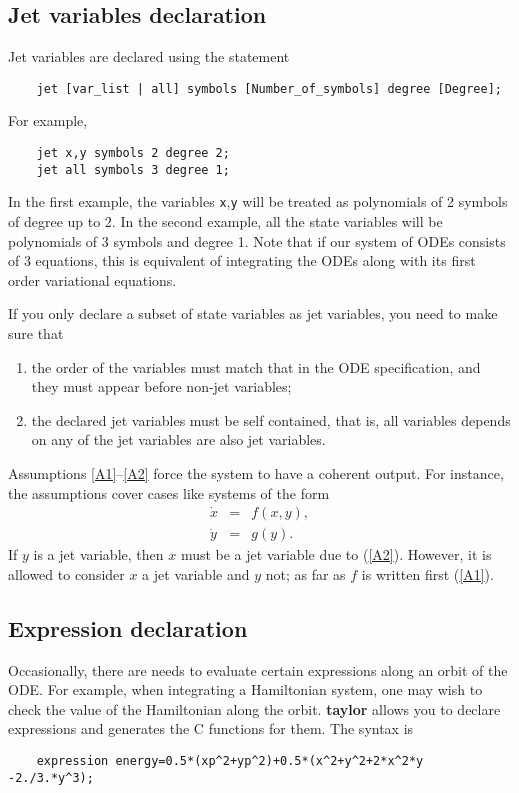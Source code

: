\documentclass[10pt]{article}
\theoremstyle{remark}
\newcommand{\taylorname}{{\bf taylor}}
\begin{document}
\subsection*{Jet variables declaration}
Jet variables are declared using the statement
\begin{verbatim}
    jet [var_list | all] symbols [Number_of_symbols] degree [Degree];
\end{verbatim}
For example,
\begin{verbatim}
    jet x,y symbols 2 degree 2;
    jet all symbols 3 degree 1;
\end{verbatim}
In the first example, the variables {\tt x},{\tt y} will be treated as
polynomials of 2 symbols of degree up to 2.
In the second example, all the state variables will be polynomials of
3 symbols and degree 1. Note that if our system of ODEs consists of 3
equations, this is equivalent of integrating the ODEs along with its
first order variational equations.


\bigskip

If you only declare a subset of state variables as jet variables, you
need to make sure that
\begin{enumerate}
\renewcommand{\theenumi}{A\arabic{enumi}}
\renewcommand{\labelenumi}{\theenumi.)}
    \item\label{A1} the order of the variables must match that in the
      ODE specification, and they must appear before non-jet
      variables;
    \item\label{A2} the declared jet variables must be self contained,
      that is, all variables depends on any of the jet variables are
      also jet variables.
\end{enumerate}

Assumptions \ref{A1}--\ref{A2} force the system to have a coherent
output. For instance, the assumptions cover cases like systems of the
form
\begin{eqnarray*}
    \dot x &=& f(x,y), \\
    \dot y &=& g(y).
\end{eqnarray*}
If $y$ is a jet variable, then $x$ must be a jet variable due to
(\ref{A2}). However, it is allowed to consider $x$ a jet variable and
$y$ not; as far as $f$ is written first (\ref{A1}).

\iftrue
\subsection*{Expression declaration}
Occasionally, there are needs to evaluate certain expressions along an
orbit of the ODE. For example, when integrating a Hamiltonian system,
one may wish to check the value of the Hamiltonian along the orbit.
\taylorname{} allows you to declare expressions and generates the C
functions for them.  The syntax is
\begin{verbatim}
    expression energy=0.5*(xp^2+yp^2)+0.5*(x^2+y^2+2*x^2*y -2./3.*y^3);
\end{verbatim}
\end{document}
